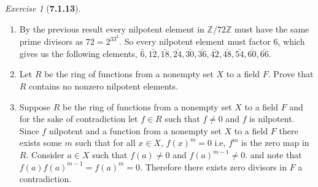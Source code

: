 \documentclass[12pt]{amsart}
\makeatletter
\theoremstyle{remark}
\newtheorem*{exercise}{Exercise}%
\def\ZZ{\ensuremath{\mathbb Z}}
\renewenvironment{proof}[1][\proofname]{\par\doublespacing
  \pushQED{\qed}%
  \normalfont \topsep6\p@\@plus6\p@\relax
  \list{}{%
    \settowidth{\leftmargin}{\itshape\proofname:\hskip\labelsep}%
    \setlength{\labelwidth}{0pt}%
    \setlength{\itemindent}{-\leftmargin}%
  }%
  \item[\hskip\labelsep\itshape#1\@addpunct{:}]\ignorespaces
}{%
  \popQED\endlist\@endpefalse
  \singlespacing
}
\theoremstyle{mycomment}
\makeatother
\begin{document}
\begin{exercise}[\textbf{7.1.13}]
\begin{enumerate}
\begin{proof}
      By the previous result every nilpotent element in $\ZZ/72\ZZ$ must have the same prime divisors as $72 = 2^33^2$. So every nilpotent element must factor 6, which gives us 
      the following elements, $\bar{6}, \bar{12}, \bar{18}, \bar{24}, \bar{30}, \bar{36}, \bar{42}, \bar{48}, \bar{54}, \bar{60}, \bar{66}$. 


      

      
    \end{proof}
    \vspace{.15in}

    \item[(c)] Let $R$ be the ring of functions from a nonempty set $X$ to a field $F$. Prove that $R$ contains no nonzero nilpotent elements. 
    \begin{proof}Suppose $R$ be the ring of functions from a nonempty set $X$ to a field $F$ and for the sake of contradiction let $f \in R$ such that 
      $f \neq 0$ and $f$ is nilpotent. Since $f$ nilpotent and a function from a nonempty set $X$ to a field $F$ there exists some $m$ 
      such that for all $x \in X$, $f(x)^m = 0$ i.e, $f^m$ is the zero map in $R$. Consider $a \in X$ such that $f(a) \neq 0$ and $f(a)^{m - 1} \neq 0$. 
      and note that $f(a)f(a)^{m - 1} = f(a)^m = 0$. Therefore there exists zero divisors in $F$ a contradiction. 
    \end{proof}
    \vspace{.15in}
  \end{enumerate}
\end{exercise}
\end{document}
